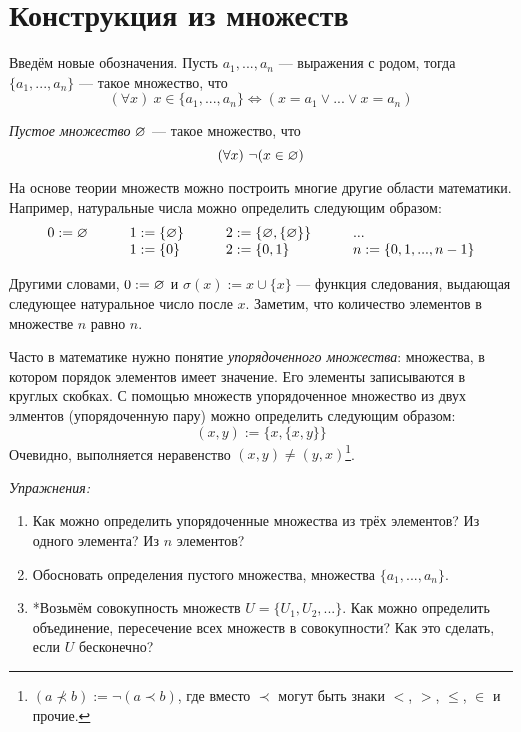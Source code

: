 \section{Конструкция из множеств}

Введём новые обозначения. Пусть $a_1,...,a_{n}$ --- выражения с родом,
тогда $\{a_{1},...,a_{n}\}$ --- такое множество, что
\[
	(\forall x)~x\in \{a_1,...,a_{n}\}\iff (x=a_1\lor...\lor x=a_{n})
\]

{\it Пустое множество} $\varnothing$ --- такое множество, что
\[
	(\forall x)~\lnot(x\in \varnothing)
\]

На основе теории множеств можно построить многие другие области математики.
Например, натуральные числа можно определить следующим образом:
\[
	\begin{array}{llll}
		0  :=\varnothing\qquad & 1  :=\{\varnothing\}\qquad & 2  :=\{\varnothing,\{\varnothing\}\}\qquad & ... \\
		                 & 1:=\{0\}\qquad       & 2:=\{0,1\}
		                 & n:=\{0,1,...,n-1\}
	\end{array}
\]

Другими словами, $0:=\varnothing$ и $\sigma(x):=x\cup \{x\}$ --- функция следования,
выдающая следующее натуральное число после $x$. Заметим, что количество элементов
в множестве $n$ равно $n$.

Часто в математике нужно понятие {\it упорядоченного множества}:
множества, в котором порядок элементов имеет значение. Его элементы записываются
в круглых скобках. С помощью множеств упорядоченное множество из двух
элментов (упорядоченную пару) можно определить следующим образом:
\[
	(x,y):=\{x,\{x,y\}\}
\]
Очевидно, выполняется неравенство $(x,y)\neq (y,x)$\footnote{
	$(a\nprec b):=\lnot(a\prec b)$, где вместо $\prec$ могут быть знаки
	$<$, $>$, $\leq$, $\in$ и прочие.
}.

\vspace{1em}
{\it Упражнения:}
\begin{enumerate}
	\item{}Как можно определить упорядоченные множества из трёх элементов?
	Из одного элемента? Из $n$ элементов?

	\item{}Обосновать определения пустого множества, множества $\{a_1,...,a_{n}\}$.

	\item{}*Возьмём совокупность множеств $U=\{U_{1},U_{2},...\}$.
	Как можно определить объединение, пересечение всех множеств в совокупности?
	Как это сделать, если $U$ бесконечно?
\end{enumerate}

